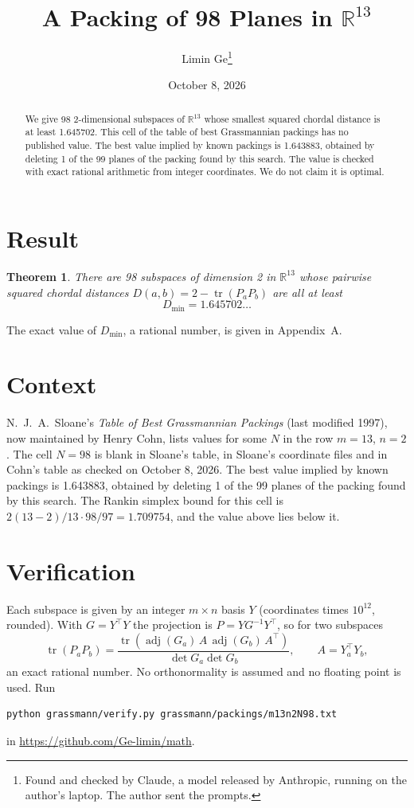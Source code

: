 \documentclass[11pt,a4paper]{article}
\title{A Packing of 98 Planes in $\mathbb{R}^{13}$}
\author{Limin Ge\thanks{Found and checked by Claude, a model released by Anthropic, running on the author's laptop. The author sent the prompts.}}
\date{October 8, 2026}
\newtheorem*{theorem}{Theorem}
\begin{document}
\maketitle
\begin{abstract}
We give 98 2-dimensional subspaces of $\mathbb{R}^{13}$ whose smallest squared chordal distance is at least 1.645702. This cell of the table of best Grassmannian packings has no published value. The best value implied by known packings is 1.643883, obtained by deleting 1 of the 99 planes of the packing found by this search. The value is checked with exact rational arithmetic from integer coordinates. We do not claim it is optimal.
\end{abstract}

\section{Result}
\begin{theorem}
There are 98 subspaces of dimension 2 in $\mathbb{R}^{13}$ whose pairwise squared chordal distances $D(a,b) = 2 - \operatorname{tr}(P_aP_b)$ are all at least
\[ D_{\min} = 1.645702\ldots \]
\end{theorem}
The exact value of $D_{\min}$, a rational number, is given in Appendix~A.


\section{Context}
N.~J.~A.~Sloane's \emph{Table of Best Grassmannian Packings} (last modified 1997), now maintained by Henry Cohn, lists values for some $N$ in the row $m=13$, $n=2$. The cell $N=98$ is blank in Sloane's table, in Sloane's coordinate files and in Cohn's table as checked on October 8, 2026. The best value implied by known packings is 1.643883, obtained by deleting 1 of the 99 planes of the packing found by this search. The Rankin simplex bound for this cell is $2(13-2)/13\cdot 98/97 = 1.709754$, and the value above lies below it.


\section{Verification}
Each subspace is given by an integer $m\times n$ basis $Y$ (coordinates times $10^{12}$, rounded). With $G=Y^\top Y$ the projection is $P=YG^{-1}Y^\top$, so for two subspaces
\[ \operatorname{tr}(P_aP_b)=\frac{\operatorname{tr}(\operatorname{adj}(G_a)\,A\,\operatorname{adj}(G_b)\,A^\top)}{\det G_a\det G_b},\qquad A=Y_a^\top Y_b, \]
an exact rational number. No orthonormality is assumed and no floating point is used. Run
\begin{verbatim}
python grassmann/verify.py grassmann/packings/m13n2N98.txt
\end{verbatim}
in \url{https://github.com/Ge-limin/math}.
\end{document}
